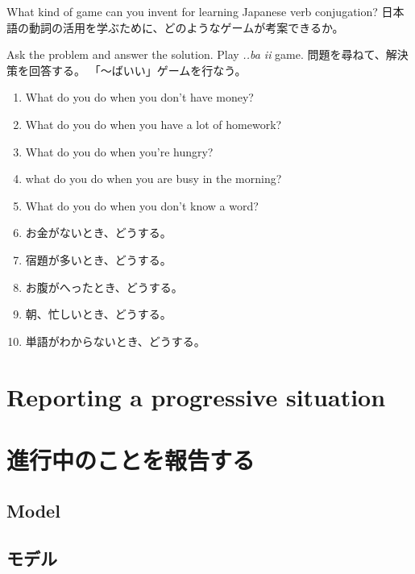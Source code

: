 \documentclass[uplatex,dvipdfmx,b5paper,english,10pt]{jsbook}
\begin{document}
\begin{toiquestion}
\ifEnglish
What kind of game can you invent for learning Japanese verb conjugation?
\else
日本語の動詞の活用を学ぶために、どのようなゲームが考案できるか。
\fi
\end{toiquestion}
\begin{toianswer} %
\ifEnglish
Ask the problem and answer the solution.
Play {\it ..ba ii\/} game.
\else
問題を尋ねて、解決策を回答する。
「～ばいい」ゲームを行なう。
\fi
\begin{enumerate}
\ifEnglish
\item What do you do when you don't have money?
\item What do you do when you have a lot of homework?
\item What do you do when you're hungry?
\item what do you do when you are busy in the morning?
\item What do you do when you don't know a word?
\else
\item お金がないとき、どうする。
\item 宿題が多いとき、どうする。
\item お腹がへったとき、どうする。
\item 朝、忙しいとき、どうする。
\item 単語がわからないとき、どうする。
\fi
\end{enumerate}

\end{toianswer}


%

\ifEnglish
\section{Reporting a progressive situation}
\else
\section{進行中のことを報告する}
\fi



\ifEnglish
\subsection{Model}
\else
\subsection{モデル}
\fi
\end{document}
